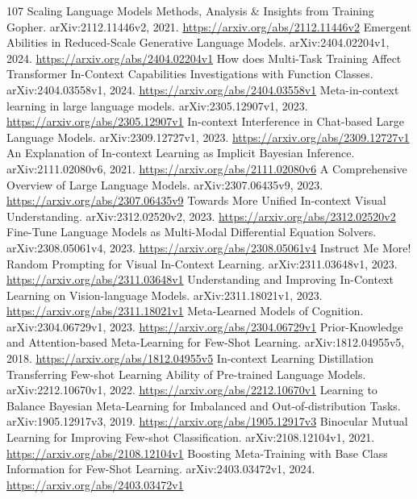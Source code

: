 \documentclass[11pt]{article}
\begin{document}
\begin{thebibliography}{107}
 Scaling Language Models Methods, Analysis \& Insights from Training Gopher. arXiv:2112.11446v2, 2021. \url{https://arxiv.org/abs/2112.11446v2}
 Emergent Abilities in Reduced-Scale Generative Language Models. arXiv:2404.02204v1, 2024. \url{https://arxiv.org/abs/2404.02204v1}
 How does Multi-Task Training Affect Transformer In-Context Capabilities Investigations with Function Classes. arXiv:2404.03558v1, 2024. \url{https://arxiv.org/abs/2404.03558v1}
 Meta-in-context learning in large language models. arXiv:2305.12907v1, 2023. \url{https://arxiv.org/abs/2305.12907v1}
 In-context Interference in Chat-based Large Language Models. arXiv:2309.12727v1, 2023. \url{https://arxiv.org/abs/2309.12727v1}
 An Explanation of In-context Learning as Implicit Bayesian Inference. arXiv:2111.02080v6, 2021. \url{https://arxiv.org/abs/2111.02080v6}
 A Comprehensive Overview of Large Language Models. arXiv:2307.06435v9, 2023. \url{https://arxiv.org/abs/2307.06435v9}
 Towards More Unified In-context Visual Understanding. arXiv:2312.02520v2, 2023. \url{https://arxiv.org/abs/2312.02520v2}
 Fine-Tune Language Models as Multi-Modal Differential Equation Solvers. arXiv:2308.05061v4, 2023. \url{https://arxiv.org/abs/2308.05061v4}
 Instruct Me More! Random Prompting for Visual In-Context Learning. arXiv:2311.03648v1, 2023. \url{https://arxiv.org/abs/2311.03648v1}
 Understanding and Improving In-Context Learning on Vision-language Models. arXiv:2311.18021v1, 2023. \url{https://arxiv.org/abs/2311.18021v1}
 Meta-Learned Models of Cognition. arXiv:2304.06729v1, 2023. \url{https://arxiv.org/abs/2304.06729v1}
 Prior-Knowledge and Attention-based Meta-Learning for Few-Shot Learning. arXiv:1812.04955v5, 2018. \url{https://arxiv.org/abs/1812.04955v5}
 In-context Learning Distillation Transferring Few-shot Learning Ability of Pre-trained Language Models. arXiv:2212.10670v1, 2022. \url{https://arxiv.org/abs/2212.10670v1}
 Learning to Balance Bayesian Meta-Learning for Imbalanced and Out-of-distribution Tasks. arXiv:1905.12917v3, 2019. \url{https://arxiv.org/abs/1905.12917v3}
 Binocular Mutual Learning for Improving Few-shot Classification. arXiv:2108.12104v1, 2021. \url{https://arxiv.org/abs/2108.12104v1}
 Boosting Meta-Training with Base Class Information for Few-Shot Learning. arXiv:2403.03472v1, 2024. \url{https://arxiv.org/abs/2403.03472v1}

\end{thebibliography}
\end{document}

